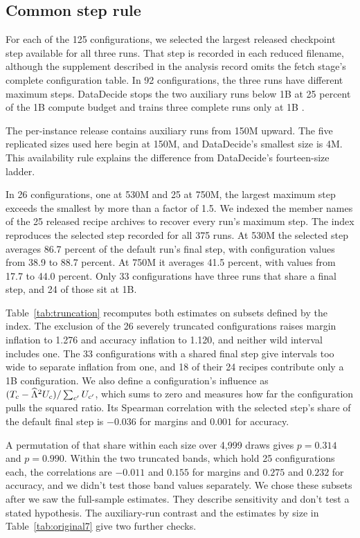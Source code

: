 \subsection{Common step rule}
\label{app:schedule}
For each of the 125 configurations, we selected the largest released checkpoint step available for all three runs. That step is recorded in each reduced filename, although the supplement described in the analysis record omits the fetch stage's complete configuration table. In 92 configurations, the three runs have different maximum steps. DataDecide stops the two auxiliary runs below 1B at 25 percent of the 1B compute budget and trains three complete runs only at 1B \citep{magnusson2025}.

The per-instance release contains auxiliary runs from 150M upward. The five replicated sizes used here begin at 150M, and DataDecide's smallest size is 4M. This availability rule explains the difference from DataDecide's fourteen-size ladder.

In 26 configurations, one at 530M and 25 at 750M, the largest maximum step exceeds the smallest by more than a factor of 1.5. We indexed the member names of the 25 released recipe archives to recover every run's maximum step. The index reproduces the selected step recorded for all 375 runs. At 530M the selected step averages 86.7 percent of the default run's final step, with configuration values from 38.9 to 88.7 percent. At 750M it averages 41.5 percent, with values from 17.7 to 44.0 percent. Only 33 configurations have three runs that share a final step, and 24 of those sit at 1B.

Table~\ref{tab:truncation} recomputes both estimates on subsets defined by the index. The exclusion of the 26 severely truncated configurations raises margin inflation to 1.276 and accuracy inflation to 1.120, and neither wild interval includes one. The 33 configurations with a shared final step give intervals too wide to separate inflation from one, and 18 of their 24 recipes contribute only a 1B configuration. We also define a configuration's influence as $(T_c-\widehat{\Lambda}^2U_c)/\sum_{c'}U_{c'}$, which sums to zero and measures how far the configuration pulls the squared ratio. Its Spearman correlation with the selected step's share of the default final step is $-0.036$ for margins and $0.001$ for accuracy.

A permutation of that share within each size over 4,999 draws gives $p=0.314$ and $p=0.990$. Within the two truncated bands, which hold 25 configurations each, the correlations are $-0.011$ and $0.155$ for margins and $0.275$ and $0.232$ for accuracy, and we didn't test those band values separately. We chose these subsets after we saw the full-sample estimates. They describe sensitivity and don't test a stated hypothesis. The auxiliary-run contrast and the estimates by size in Table~\ref{tab:original7} give two further checks.

